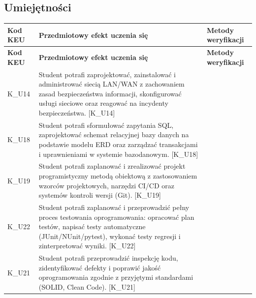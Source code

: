 \documentclass[12pt, a4paper]{article}
\newcommand{\thdrule}{\noalign{\global\setlength{\extrarowheight}{0pt}}}
\newcommand{\thdend}{\noalign{\global\setlength{\extrarowheight}{3pt}}}
\begin{document}
\subsection*{Umiejętności}
{\scriptsize
\begin{longtable}{m{1.6cm}m{9.0cm}m{4.2cm}}
\thdrule\toprule
\rowcolor{pjatkRed} {\color{white}\footnotesize\textbf{\vphantom{Ag}Kod KEU}} & {\color{white}\footnotesize\textbf{\vphantom{Ag}Przedmiotowy efekt uczenia się}} & {\color{white}\footnotesize\textbf{\vphantom{Ag}Metody weryfikacji}} \\
\midrule\thdend
\endfirsthead
\thdrule\toprule
\rowcolor{pjatkRed} {\color{white}\footnotesize\textbf{\vphantom{Ag}Kod KEU}} & {\color{white}\footnotesize\textbf{\vphantom{Ag}Przedmiotowy efekt uczenia się}} & {\color{white}\footnotesize\textbf{\vphantom{Ag}Metody weryfikacji}} \\
\midrule\thdend
\endhead
  \rowcolor{tableRowLight} K\_U14 & Student potrafi zaprojektować, zainstalować i administrować siecią LAN/WAN z zachowaniem zasad bezpieczeństwa informacji, skonfigurować usługi sieciowe oraz reagować na incydenty bezpieczeństwa. {[}K\_U14{]} &  \\
  \rowcolor{tableRowAlt} K\_U18 & Student potrafi sformułować zapytania SQL, zaprojektować schemat relacyjnej bazy danych na podstawie modelu ERD oraz zarządzać transakcjami i uprawnieniami w systemie bazodanowym. {[}K\_U18{]} &  \\
  \rowcolor{tableRowLight} K\_U19 & Student potrafi zaplanować i zrealizować projekt programistyczny metodą obiektową z zastosowaniem wzorców projektowych, narzędzi CI/CD oraz systemów kontroli wersji (Git). {[}K\_U19{]} &  \\
  \rowcolor{tableRowAlt} K\_U22 & Student potrafi zaplanować i przeprowadzić pełny proces testowania oprogramowania: opracować plan testów, napisać testy automatyczne (JUnit/NUnit/pytest), wykonać testy regresji i zinterpretować wyniki. {[}K\_U22{]} &  \\
  \rowcolor{tableRowLight} K\_U21 & Student potrafi przeprowadzić inspekcję kodu, zidentyfikować defekty i poprawić jakość oprogramowania zgodnie z przyjętymi standardami (SOLID, Clean Code). {[}K\_U21{]} &  \\
\bottomrule
\end{longtable}}
\end{document}

